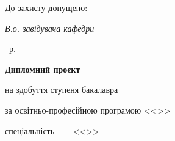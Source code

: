 \thispagestyle{empty}%

\newcommand{\titleSig}{%
  \underline{\hspace{0.17\textwidth}}%
}

\begin{center}%
\thesisOrganization

\thesisOOrganization

\thesisInstitute

\thesisDepartment
\end{center}
%
\vspace{0pt plus4fill}

\begin{flushright}%
До захисту допущено:

\textsl{В.о. завідувача кафедри}
\begin{flushright}
\underline{\hspace{0.26\textwidth}} \; \textbf{\thisisHD}
\end{flushright}%
\begin{flushright}
\underline{\hspace{0.1\textwidth}} \underline{\hspace{0.2\textwidth}} \; \the\year\ р.
\end{flushright}%
\end{flushright}%
%
\vspace{0pt plus4fill}
\begin{center}
\textbf {\Large{Дипломний проєкт}}

на здобуття ступеня бакалавра

за освітньо-професійною програмою <<\thesisOsvitnyaPrograma>>

спеціальність \thesisSpecialtyNumber~---
<<\thesisSpecialtyTitle>>
\end{center}

\vspace{0pt plus1fill}
\begin{center}%
\textbf {\large \MakeUppercase{\thesisTitle}}

\end{center}%
%
\vspace{0pt plus5fill}


